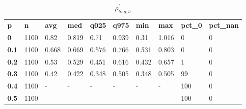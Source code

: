 \begin{table}[h]
 \centering 
\footnotesize
\caption{$\rho_{hsg,h}^\prime $}
\label{tab:alphahsgh}
\begin{tabular}[h]{| l l l l l l l l l l|
    } \hline
\textbf{ p} & \textbf{ n} & \textbf{ avg} & \textbf{ med} & \textbf{ q025} & \textbf{ q975} & \textbf{ min} & \textbf{ max} & \textbf{ pct\_0} & \textbf{ pct\_nan}
           \\
  \textbf{  0} & 1100 &  0.82 & 0.819 &  0.71 & 0.939 &  0.31 & 1.016 &   0 & 0
           \\
  \textbf{0.1} & 1100 & 0.668 & 0.669 & 0.576 & 0.766 & 0.531 & 0.803 &   0 & 0
           \\
  \textbf{0.2} & 1100 &  0.53 & 0.529 & 0.451 & 0.616 & 0.432 & 0.657 &   1 & 0
           \\
  \textbf{0.3} & 1100 &  0.42 & 0.422 & 0.348 & 0.505 & 0.348 & 0.505 &  99 & 0
           \\
  \textbf{0.4} & 1100 & - & - & - & - & - & - & 100 & 0
           \\
  \textbf{0.5} & 1100 & - & - & - & - & - & - & 100 & 0
           \\
 \hline \end{tabular}
 \end{table}
